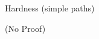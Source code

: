 \begin{frame}{Hardness \small (simple paths)}

\onslide<+>
\onslide<+>
\begin{center}
 
\end{center}

\onslide<+>
\vfill \hfill \small(No Proof)
\end{frame}